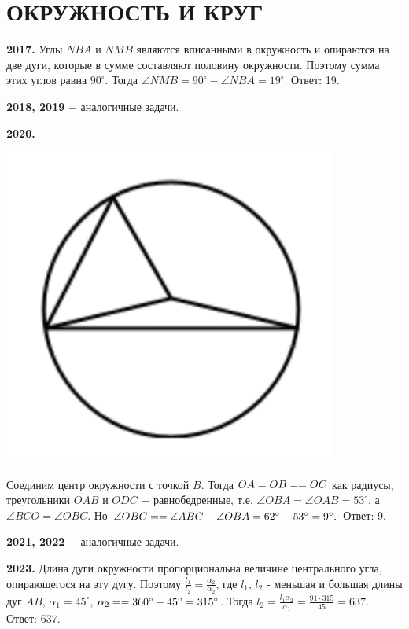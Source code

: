 \section{ОКРУЖНОСТЬ И КРУГ}
\pagestyle{plain}

\textbf{2017.} Углы $NBA$ и $NMB$ являются вписанными в окружность и опираются на две дуги, которые в сумме составляют половину окружности. Поэтому сумма этих углов равна $90^\circ$. Тогда $\angle NMB = 90^\circ - \angle NBA = 19^\circ.$ \newline \null \hspace*{\fill} Ответ: 19.

\textbf{2018, 2019} $-$ аналогичные задачи.

\textbf{2020.}

{\centering \includegraphics[width=0.4\linewidth]{Geometry/Content/33.png}
	
}

Соединим центр окружности с точкой $B$. Тогда $OA=OB= \linebreak = OC$ как радиусы, треугольники $OAB$ и $ODC$ $-$ равнобедренные, т.е. $\angle OBA = \angle OAB = 53^\circ$, а $\angle BCO = \angle OBC$. Но $\angle OBC = \linebreak=\angle ABC - \angle OBA = 62^\circ - 53^\circ = 9^\circ.$ \newline \null \hspace*{\fill} Ответ: 9.

\textbf{2021, 2022} $-$ аналогичные задачи.

\textbf{2023.} Длина дуги окружности пропорциональна величине центрального угла, опирающегося на эту дугу. Поэтому $\frac{l_1}{l_2} = \frac{\alpha_2}{\alpha_2}$, где $l_1$, $l_2$ - меньшая и большая длины дуг $AB$, $\alpha_1 = 45^\circ$, $\alpha_2 = \linebreak=360^\circ - 45^\circ = 315^\circ$. Тогда $l_2 = \frac{l_1 \alpha_2}{\alpha_1} = \frac{91\cdot 315}{45} = 637$. \newline \null \hspace*{\fill} Ответ: 637.

